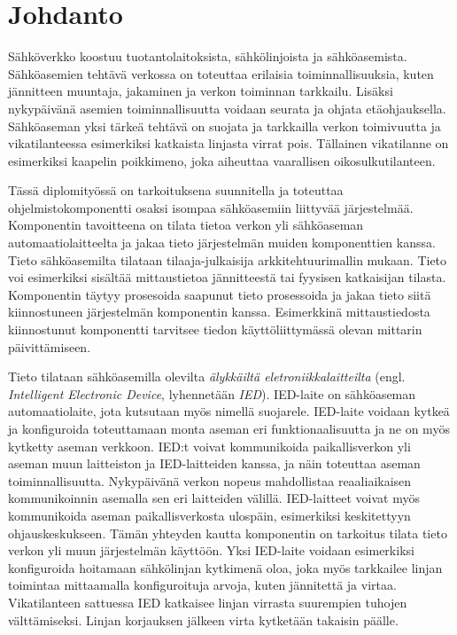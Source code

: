 \chapter{Johdanto}
\label{ch:johdanto}
Sähköverkko koostuu tuotantolaitoksista, sähkölinjoista ja sähköasemista. Sähköasemien tehtävä verkossa on toteuttaa erilaisia toiminnallisuuksia, kuten jännitteen muuntaja, jakaminen ja verkon toiminnan tarkkailu. Lisäksi nykypäivänä asemien toiminnallisuutta voidaan seurata ja ohjata etäohjauksella. Sähköaseman yksi tärkeä tehtävä on suojata ja tarkkailla verkon toimivuutta ja vikatilanteessa esimerkiksi katkaista linjasta virrat pois. Tällainen vikatilanne on esimerkiksi kaapelin poikkimeno, joka aiheuttaa vaarallisen oikosulkutilanteen.

Tässä diplomityössä on tarkoituksena suunnitella ja toteuttaa ohjelmistokomponentti osaksi isompaa sähköasemiin liittyvää järjestelmää. Komponentin tavoitteena on tilata tietoa verkon yli sähköaseman automaatiolaitteelta ja jakaa tieto järjestelmän muiden komponenttien kanssa. Tieto sähköasemilta tilataan tilaaja-julkaisija arkkitehtuurimallin mukaan. Tieto voi esimerkiksi sisältää mittaustietoa jännitteestä tai fyysisen katkaisijan tilasta. Komponentin täytyy prosesoida saapunut tieto prosessoida ja jakaa tieto siitä kiinnostuneen järjestelmän komponentin kanssa. Esimerkkinä mittaustiedosta kiinnostunut komponentti tarvitsee tiedon käyttöliittymässä olevan mittarin päivittämiseen.

Tieto tilataan sähköasemilla olevilta \emph{älykkäiltä eletroniikkalaitteilta} (engl. \emph{Intelligent Electronic Device}, lyhennetään \emph{IED}). IED-laite on sähköaseman automaatiolaite, jota kutsutaan myös nimellä suojarele. IED-laite voidaan kytkeä ja konfiguroida toteuttamaan monta aseman eri funktionaalisuutta ja ne on myös kytketty aseman verkkoon. IED:t voivat kommunikoida paikallisverkon yli aseman muun laitteiston ja IED-laitteiden kanssa, ja näin toteuttaa aseman toiminnallisuutta. Nykypäivänä verkon nopeus mahdollistaa reaaliaikaisen kommunikoinnin asemalla sen eri laitteiden välillä. IED-laitteet voivat myös kommunikoida aseman paikallisverkosta ulospäin, esimerkiksi keskitettyyn ohjauskeskukseen. Tämän yhteyden kautta komponentin on tarkoitus tilata tieto verkon yli muun järjestelmän käyttöön. Yksi IED-laite voidaan esimerkiksi konfiguroida hoitamaan sähkölinjan kytkimenä oloa, joka myös tarkkailee linjan toimintaa mittaamalla konfiguroituja arvoja, kuten jännitettä ja virtaa. Vikatilanteen sattuessa IED katkaisee linjan virrasta suurempien tuhojen välttämiseksi. Linjan korjauksen jälkeen virta kytketään takaisin päälle.

